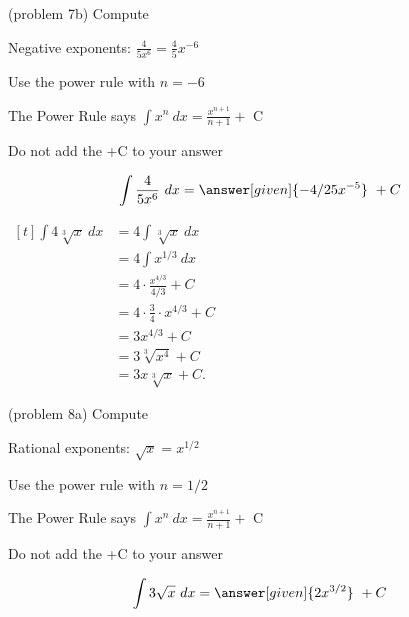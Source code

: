 \documentclass{ximera}
\begin{document}
\begin{problem}(problem 7b)
Compute 

\begin{hint}
Negative exponents: $\frac{4}{5x^6} = \frac45 x^{-6}$
\end{hint}
\begin{hint}
Use the power rule with $n=-6$
\end{hint}
\begin{hint}
The Power Rule says $\int x^n \ dx = \frac{x^{n+1}}{n+1} +$ C
\end{hint}
\begin{hint}
\begin{center}
Do not add the +C to your answer
\end{center}
\end{hint}

\[
\int \frac{4}{5x^6} \ dx =
\answer[given]{-4/25 x^{-5}} \ + C
\]
\end{problem}


\begin{example}[example 8]
$\begin{aligned}[t]
\int 4\sqrt[3]x  \ dx &= 4 \int \sqrt[3] x \  dx  \\
&= 4 \int x^{1/3} \ dx \\
&= 4 \cdot \frac{x^{4/3}}{4/3} +C \\[3pt]
&= 4 \cdot \frac{3}{4} \cdot x^{4/3} +C \\[3pt]
&= 3x^{4/3} +C \\
&= 3\sqrt[3] {x^4} +C \\
&= 3x\sqrt[3] x +C.
\end{aligned}$
\end{example}


\begin{problem}(problem 8a)
Compute 

\begin{hint}
Rational exponents: $\sqrt x = x^{1/2}$
\end{hint}
\begin{hint}
Use the power rule with $n=1/2$
\end{hint}
\begin{hint}
The Power Rule says $\int x^n \ dx = \frac{x^{n+1}}{n+1} +$ C
\end{hint}
\begin{hint}
\begin{center}
Do not add the +C to your answer
\end{center}
\end{hint}

\[
\int 3\sqrt x \ dx =
\answer[given]{2x^{3/2}} \ + C
\]
\end{problem}
\end{document}
